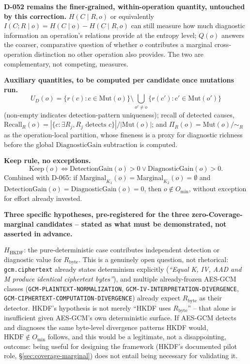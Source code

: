 \documentclass[11pt,a4paper]{article}
\begin{document}
\textbf{D-052 remains the finer-grained, within-operation quantity, untouched by this correction.} $H(C\mid R, o)$ or equivalently $I(C;R\mid o) = H(C\mid o) - H(C\mid R,o)$ can still measure how much diagnostic information an operation's relations provide at the entropy level; $Q(o)$ answers the coarser, comparative question of whether $o$ contributes a marginal cross-operation distinction no other operation also provides. The two are complementary, not competing, measures.

\textbf{Auxiliary quantities, to be computed per candidate once mutations run.}
\[
U_D(o) = \{r(c): c\in\text{Mut}(o)\} \setminus \bigcup_{o'\neq o}\{r(c'): c'\in\text{Mut}(o')\}
\]
(non-empty indicates detection-pattern uniqueness); recall of detected causes, $\text{Recall}_R(o) = |\{c: \exists R_j, R_j \text{ detects } c\}| / |\text{Mut}(o)|$; and $\Pi_R(o) = \text{Mut}(o)/\!\sim_R$ as the operation-local partition, whose fineness is a proxy for diagnostic richness before the global $\text{DiagnosticGain}$ subtraction is computed.

\textbf{Keep rule, no exceptions.}
\[
\text{Keep}(o) \iff \text{DetectionGain}(o)>0 \vee \text{DiagnosticGain}(o)>0.
\]
Combined with D-065: if $\text{Marginal}_{K_1}(o)=\text{Marginal}_{K_2}(o)=\emptyset$ and $\text{DetectionGain}(o)=\text{DiagnosticGain}(o)=0$, then $o\notin O_{\min}$, without exception for effort already invested.

\textbf{Three specific hypotheses, pre-registered for the three zero-Coverage-marginal candidates -- stated as what must be demonstrated, not asserted in advance.}

$H_{\text{HKDF}}$: the pure-deterministic case contributes independent detection or diagnostic value for $R_{\text{byte}}$. This is a genuinely open question, not rhetorical: \texttt{gcm.ciphertext} already states determinism explicitly (\emph{``Equal K, IV, AAD and M produce identical ciphertext bytes''}), and multiple already-frozen AES-GCM classes (\texttt{GCM-PLAINTEXT-NORMALIZATION}, \texttt{GCM-IV-INTERPRETATION-DIVERGENCE}, \texttt{GCM-CIPHERTEXT-COMPUTATION-DIVERGENCE}) already expect $R_{\text{byte}}$ as their detector. HKDF's hypothesis is not merely ``HKDF uses $R_{\text{byte}}$'' -- that alone is insufficient given AES-GCM's own deterministic surface. If AES-GCM detects and diagnoses the same byte-level divergence patterns HKDF would, $\text{HKDF}\notin O_{\min}$ follows, and this would be a legitimate, not a disappointing, outcome: being useful for designing the framework (HKDF's documented pilot role, \S\ref{sec:coverage-marginal}) does not entail being necessary for validating it.
\end{document}
